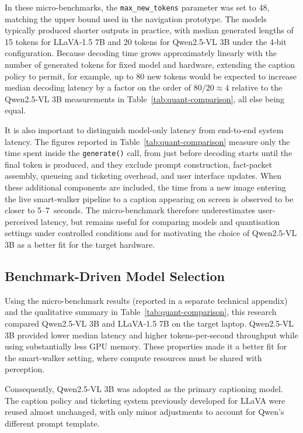 \documentclass[11pt,a4paper]{article}
\newcommand{\code}[1]{\texttt{#1}}
\begin{document}
In these micro-benchmarks, the \code{max\_new\_tokens} parameter was set to 48, matching the upper bound used in the navigation prototype. The models typically produced shorter outputs in practice, with median generated lengths of 15 tokens for LLaVA-1.5 7B and 20 tokens for Qwen2.5-VL 3B under the 4-bit configuration. Because decoding time grows approximately linearly with the number of generated tokens for fixed model and hardware, extending the caption policy to permit, for example, up to 80 new tokens would be expected to increase median decoding latency by a factor on the order of $80 / 20 \approx 4$ relative to the Qwen2.5-VL 3B measurements in Table~\ref{tab:quant-comparison}, all else being equal.

It is also important to distinguish model-only latency from end-to-end system latency. The figures reported in Table~\ref{tab:quant-comparison} measure only the time spent inside the \code{generate()} call, from just before decoding starts until the final token is produced, and they exclude prompt construction, fact-packet assembly, queueing and ticketing overhead, and user interface updates. When these additional components are included, the time from a new image entering the live smart-walker pipeline to a caption appearing on screen is observed to be closer to 5--7~seconds. The micro-benchmark therefore underestimates user-perceived latency, but remains useful for comparing models and quantisation settings under controlled conditions and for motivating the choice of Qwen2.5-VL 3B as a better fit for the target hardware.

\subsection{Benchmark-Driven Model Selection}

Using the micro-benchmark results (reported in a separate technical appendix) and the qualitative summary in Table~\ref{tab:quant-comparison}, this research compared Qwen2.5-VL 3B and LLaVA-1.5 7B on the target laptop. Qwen2.5-VL 3B provided lower median latency and higher tokens-per-second throughput while using substantially less GPU memory. These properties made it a better fit for the smart-walker setting, where compute resources must be shared with perception.

Consequently, Qwen2.5-VL 3B was adopted as the primary captioning model. The caption policy and ticketing system previously developed for LLaVA were reused almost unchanged, with only minor adjustments to account for Qwen's different prompt template.
\end{document}
